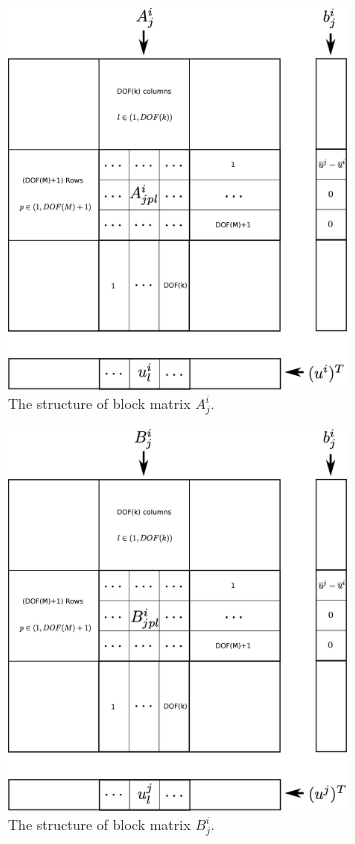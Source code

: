 \documentclass[review]{elsarticle}
\begin{document}
\begin{figure}[!htp]
	\centering
	\includegraphics[width=0.8\textwidth]{Aij.eps}
	\caption{The structure of block matrix $A^i_j$.}
	\label{fig:BlockAij}
\end{figure}

\begin{figure}[!htp]
	\centering
	\includegraphics[width=0.8\textwidth]{Bij.eps}
	\caption{The structure of block matrix $B^i_j$.}
	\label{fig:BlockBij}
\end{figure}
\end{document}
